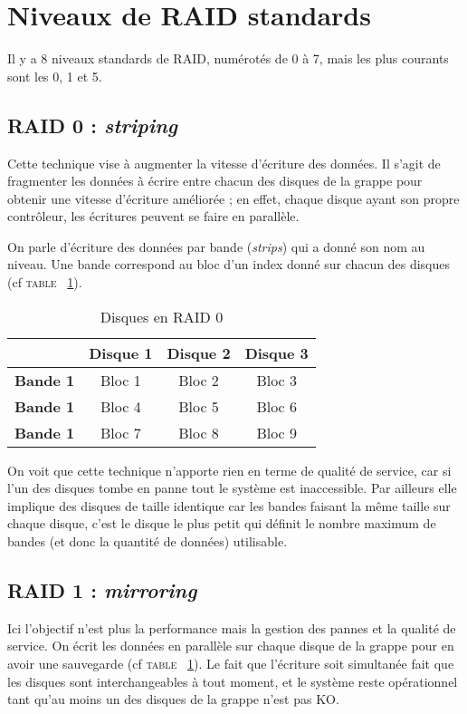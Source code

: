 \section{Niveaux de RAID standards}
Il y a 8 niveaux standards de RAID, numérotés de 0 à 7, mais les plus courants sont les 0, 1 et 5. 

\subsection{RAID 0 : \textit{striping}}
Cette technique vise à augmenter la vitesse d'écriture des données. Il s'agit de fragmenter les données à écrire entre chacun des disques de la grappe pour obtenir une vitesse d'écriture améliorée ; en effet, chaque disque ayant son propre contrôleur, les écritures peuvent se faire en parallèle. 

On parle d'écriture des données par bande (\textit{strips}) qui a donné son nom au niveau. Une bande correspond au bloc d'un index donné sur chacun des disques (cf \textsc{table ~\ref{striping}}).

\begin{table}[h]
    \centering
    \caption{\label{striping} Disques en RAID 0}
    \begin{tabular}{|c|c|c|c|}
        \hline
         & \textbf{Disque 1} & \textbf{Disque 2} & \textbf{Disque 3} \\
        \hline
        \textbf{Bande 1} & Bloc 1 & Bloc 2 & Bloc 3 \\
        \hline
        \textbf{Bande 1} & Bloc 4 & Bloc 5 & Bloc 6 \\
        \hline
        \textbf{Bande 1} & Bloc 7 & Bloc 8 & Bloc 9 \\
        \hline
    \end{tabular}
\end{table}

On voit que cette technique n'apporte rien en terme de qualité de service, car si l'un des disques tombe en panne tout le système est inaccessible. Par ailleurs elle implique des disques de taille identique car les bandes faisant la même taille sur chaque disque, c'est le disque le plus petit qui définit le nombre maximum de bandes (et donc la quantité de données) utilisable. 

\subsection{RAID 1 : \textit{mirroring}}
Ici l'objectif n'est plus la performance mais la gestion des pannes et la qualité de service. On écrit les données en parallèle sur chaque disque de la grappe pour en avoir une sauvegarde (cf \textsc{table ~\ref{striping}}). Le fait que l'écriture soit simultanée fait que les disques sont interchangeables à tout moment, et le système reste opérationnel tant qu'au moins un des disques de la grappe n'est pas KO. 

